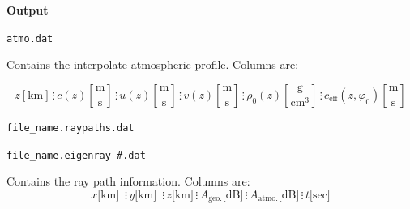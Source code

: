 \documentclass[10pt]{article}
\begin{document}
\vspace{0.01\textheight}


 \hspace{-0.25in}\textbf{Output}\newline

	\verb=atmo.dat= 
	
	Contains the interpolate atmospheric profile.  Columns are:
	\begin{small}
	\begin{equation*}
	 z \left[ \text{km} \right] \hspace{2pt} \vdots \hspace{2pt}
	 c (z) \left[\frac{\text{m}}{\text{s}} \right] \hspace{2pt} \vdots \hspace{2pt}
	 u(z) \left[ \frac{\text{m}}{\text{s}} \right] \hspace{2pt} \vdots \hspace{2pt}
	 v(z) \left[ \frac{\text{m}}{\text{s}} \right] \hspace{2pt} \vdots \hspace{2pt}
	 \rho_0(z) \left[ \frac{\text{g}}{\text{cm}^3} \right] \hspace{2pt} \vdots \hspace{2pt}
	 c_\text{eff} \left(z, \varphi_0 \right) \left[\frac{\text{m}}{\text{s}} \right] 
	\end{equation*}
	\end{small}

\newpage

	\verb=file_name.raypaths.dat= 

	\verb=file_name.eigenray-#.dat= 
	
	Contains the ray path information.  Columns are:
	\begin{equation*}
	x \text{[km] } \hspace{2pt} \vdots \hspace{2pt} 
	y \text{[km] } \hspace{2pt} \vdots \hspace{2pt}  
	z\text{[km]} \hspace{2pt} \vdots \hspace{2pt} 
	A_\text{geo.} \text{[dB]} \hspace{2pt} \vdots \hspace{2pt}
	A_\text{atmo.} \text{[dB]} \hspace{2pt} \vdots \hspace{2pt}	
	t \text{[sec]}
	\end{equation*}
\end{document}
